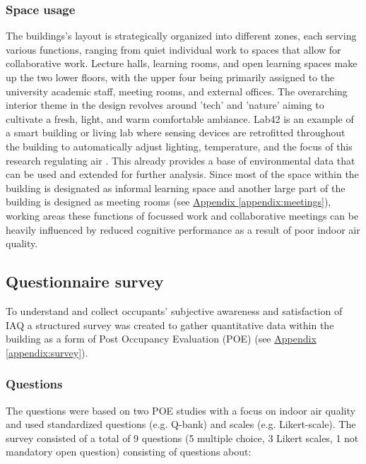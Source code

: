 \subsubsection{Space usage}

The buildings's layout is strategically organized into different zones, each serving various functions, ranging from quiet individual work to spaces that allow for collaborative work. Lecture halls, learning rooms, and open learning spaces make up the two lower floors, with the upper four being primarily assigned to the university academic staff, meeting rooms, and external offices. The overarching interior theme in the design revolves around 'tech' and 'nature' aiming to cultivate a fresh, light, and warm comfortable ambiance. Lab42 is an example of a smart building or living lab where sensing devices are retrofitted throughout the building to automatically adjust lighting, temperature, and the focus of this research regulating air \cite{architects_lab42_2022}. This already provides a base of environmental data that can be used and extended for further analysis. Since most of the space within the building is designated as informal learning space and another large part of the building is designed as meeting rooms (see \hyperref[appendix:meetings]{Appendix \ref*{appendix:meetings}}), working areas these functions of focussed work and collaborative meetings can be heavily influenced by reduced cognitive performance as a result of poor indoor air quality.

\subsection{Questionnaire survey}
\label{sec:questionnaire}

To understand and collect occupants' subjective awareness and satisfaction of IAQ a structured survey was created to gather quantitative data within the building as a form of Post Occupancy Evaluation (POE) (see \hyperref[appendix:survey]{Appendix \ref*{appendix:survey}}).


\subsubsection{Questions}
The questions were based on two POE studies with a focus on indoor air quality \cite{silva_post-occupancy_2017, son_perceived_2023} and used standardized questions (e.g. Q-bank) and scales (e.g. Likert-scale). The survey consisted of a total of 9 questions (5 multiple choice, 3 Likert scales, 1 not mandatory open question) consisting of questions about:

